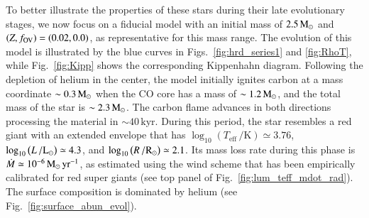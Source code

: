 \documentclass[main.tex]{subfiles}
\begin{document}
To better illustrate the properties of these stars during their late evolutionary stages,  we now focus on a fiducial model with an initial mass of $\rm 2.5\mathrm{\,M_\odot}$ and $(Z,f_{\rm OV}) = (0.02,0.0)$, as representative for this mass range. 
The evolution of this model is illustrated by the blue curves in Figs.~\ref{fig:hrd_series1} and \ref{fig:RhoT}, while Fig.~\ref{fig:Kipp} 
shows the corresponding Kippenhahn diagram. Following the depletion of helium in the center, the model initially ignites carbon at a mass coordinate $\sim 0.3\mathrm{\,M_\odot}$ when the CO core has a mass of $\sim 1.2\mathrm{\,M_\odot}$, and the total mass of the star is $\sim 2.3\mathrm{\,M_\odot}$. The carbon flame advances in both directions processing the material in $\sim 40\,\text{kyr}$. During this period, the star resembles a 
red giant with an extended envelope that has  $\log_{10} \left( T_{\text{eff}}\,/ \text{K} \right) \simeq 3.76$, $\log_{10} \left( L\,/ {\rm L}_\odot \right) \simeq 4.3$, and $\log_{10} \left( R\,/ {\rm R}_\odot \right) \simeq 2.1$.
Its mass loss rate during this phase is $\dot{M} \simeq 10^{-6}\mathrm{\,M_\odot}\,\text{yr}^{-1}$, as  estimated using the \cite{deJager1988} wind scheme that has been empirically calibrated for red super giants (see top panel of Fig.~\ref{fig:lum_teff_mdot_rad}). 
The surface composition is dominated by helium  (see Fig.~\ref{fig:surface_abun_evol}). 
\end{document}
